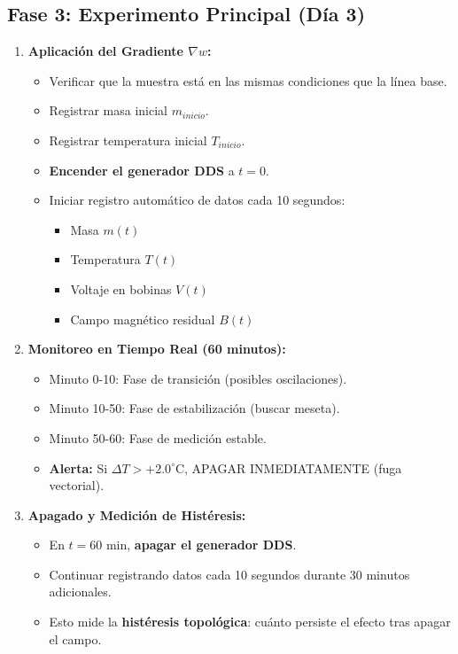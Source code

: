 \documentclass[12pt, a4paper]{article}
\begin{document}
\subsection{Fase 3: Experimento Principal (Día 3)}

\begin{enumerate}[label=\textbf{Paso \arabic*:}, leftmargin=*, start=7]
    \item \textbf{Aplicación del Gradiente $\nabla w$:}
    \begin{itemize}
        \item Verificar que la muestra está en las mismas condiciones que la línea base.
        \item Registrar masa inicial $m_{inicio}$.
        \item Registrar temperatura inicial $T_{inicio}$.
        \item \textbf{Encender el generador DDS} a $t=0$.
        \item Iniciar registro automático de datos cada 10 segundos:
        \begin{itemize}
            \item Masa $m(t)$
            \item Temperatura $T(t)$
            \item Voltaje en bobinas $V(t)$
            \item Campo magnético residual $B(t)$
        \end{itemize}
    \end{itemize}
    
    \item \textbf{Monitoreo en Tiempo Real (60 minutos):}
    \begin{itemize}
        \item Minuto 0-10: Fase de transición (posibles oscilaciones).
        \item Minuto 10-50: Fase de estabilización (buscar meseta).
        \item Minuto 50-60: Fase de medición estable.
        \item \textbf{Alerta:} Si $\Delta T > +2.0^\circ$C, APAGAR INMEDIATAMENTE (fuga vectorial).
    \end{itemize}
    
    \item \textbf{Apagado y Medición de Histéresis:}
    \begin{itemize}
        \item En $t=60$ min, \textbf{apagar el generador DDS}.
        \item Continuar registrando datos cada 10 segundos durante 30 minutos adicionales.
        \item Esto mide la \textbf{histéresis topológica}: cuánto persiste el efecto tras apagar el campo.
    \end{itemize}
\end{enumerate}
\end{document}

